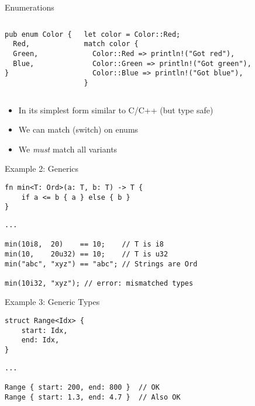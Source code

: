 \begin{frame}[fragile]{Enumerations}
\begin{columns}[t,onlytextwidth]
\begin{verbatim}
pub enum Color {
  Red,
  Green,
  Blue,
}
\end{verbatim}
\begin{verbatim}
let color = Color::Red;
match color {
  Color::Red => println!("Got red"),
  Color::Green => println!("Got green"),
  Color::Blue => println!("Got blue"),
}
\end{verbatim}
\end{columns}
  \begin{itemize}
    \item<1-> In its simplest form similar to C/C++ (but type safe)
    \item<2> We can match (switch) on enums
    \item<2> We \emph{must} match all variants
  \end{itemize}
\end{frame}

\begin{frame}[fragile]{Example 2: Generics}

\begin{verbatim}
fn min<T: Ord>(a: T, b: T) -> T {
    if a <= b { a } else { b }
}
\end{verbatim}
\pause
\begin{verbatim}
...

min(10i8,  20)    == 10;    // T is i8
min(10,    20u32) == 10;    // T is u32
min("abc", "xyz") == "abc"; // Strings are Ord

min(10i32, "xyz"); // error: mismatched types
\end{verbatim}

\end{frame}


\begin{frame}[fragile]{Example 3: Generic Types}
\begin{verbatim}
struct Range<Idx> {
    start: Idx,
    end: Idx,
}
\end{verbatim}
\pause
\begin{verbatim}
...

Range { start: 200, end: 800 }  // OK
Range { start: 1.3, end: 4.7 }  // Also OK
\end{verbatim}
\end{frame}

